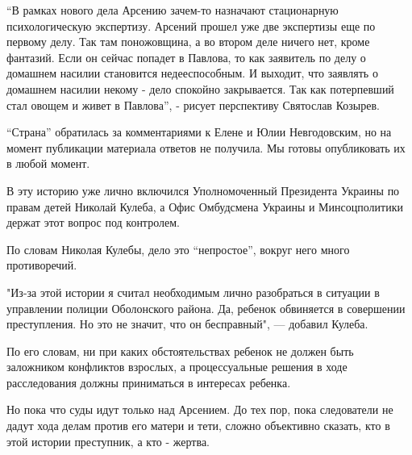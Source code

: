 “В рамках нового дела Арсению зачем-то назначают стационарную психологическую
экспертизу. Арсений прошел уже две экспертизы еще по первому делу. Так там
поножовщина, а во втором деле ничего нет, кроме фантазий. Если он сейчас
попадет в Павлова, то как заявитель по делу о домашнем насилии становится
недееспособным. И выходит, что заявлять о домашнем насилии некому - дело
спокойно закрывается. Так как потерпевший стал овощем и живет в Павлова”, -
рисует перспективу Святослав Козырев.

“Страна” обратилась за комментариями к Елене и Юлии Невгодовским, но на момент
публикации материала ответов не получила. Мы готовы опубликовать их в любой
момент.

В эту историю уже лично включился Уполномоченный Президента Украины по правам
детей Николай Кулеба, а Офис Омбудсмена Украины и Минсоцполитики держат этот
вопрос под контролем. 

По словам Николая Кулебы, дело это “непростое”, вокруг него много противоречий.

"Из-за этой истории я считал необходимым лично разобраться в ситуации в
управлении полиции Оболонского района. Да, ребенок обвиняется в совершении
преступления. Но это не значит, что он бесправный", --- добавил Кулеба.

По его словам, ни при каких обстоятельствах ребенок не должен быть заложником
конфликтов взрослых, а процессуальные решения в ходе расследования должны
приниматься в интересах ребенка.

Но пока что суды идут только над Арсением. До тех пор, пока следователи не
дадут хода делам против его матери и тети, сложно объективно сказать, кто в
этой истории преступник, а кто - жертва. 
